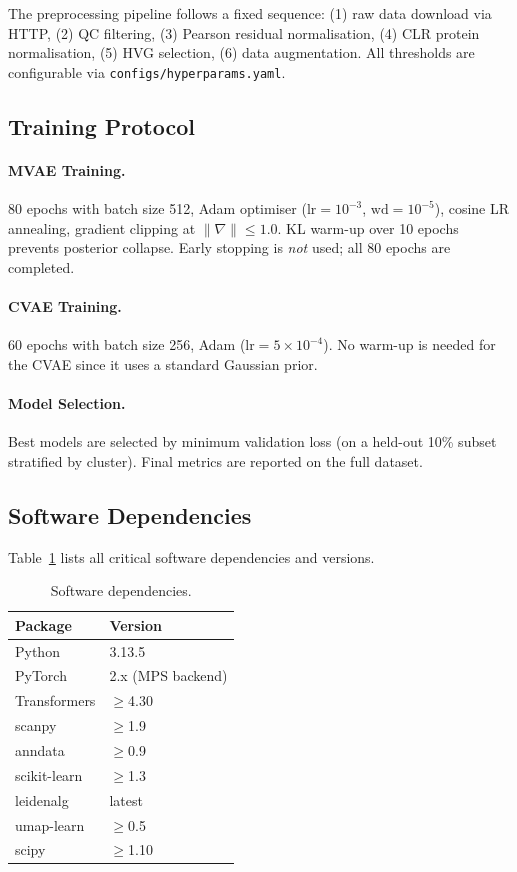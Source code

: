 \documentclass[11pt,a4paper]{article}
\begin{document}
The preprocessing pipeline follows a fixed sequence: (1) raw data download via HTTP, (2) QC filtering, (3) Pearson residual normalisation, (4) CLR protein normalisation, (5) HVG selection, (6) data augmentation.
All thresholds are configurable via \texttt{configs/hyperparams.yaml}.

\subsection{Training Protocol}

\paragraph{MVAE Training.}
80 epochs with batch size 512, Adam optimiser ($\text{lr}=10^{-3}$, $\text{wd}=10^{-5}$), cosine LR annealing, gradient clipping at $\|\nabla\| \leq 1.0$.
KL warm-up over 10 epochs prevents posterior collapse.
Early stopping is \emph{not} used; all 80 epochs are completed.

\paragraph{CVAE Training.}
60 epochs with batch size 256, Adam ($\text{lr}=5\times10^{-4}$).
No warm-up is needed for the CVAE since it uses a standard Gaussian prior.

\paragraph{Model Selection.}
Best models are selected by minimum validation loss (on a held-out 10\% subset stratified by cluster).
Final metrics are reported on the full dataset.

\subsection{Software Dependencies}

Table~\ref{tab:software} lists all critical software dependencies and versions.

\begin{table}[!ht]
\centering
\caption{Software dependencies.}
\label{tab:software}
\scriptsize
\begin{tabular}{ll}
\toprule
\textbf{Package} & \textbf{Version} \\
\midrule
Python & 3.13.5 \\
PyTorch & 2.x (MPS backend) \\
Transformers & $\geq$4.30 \\
scanpy & $\geq$1.9 \\
anndata & $\geq$0.9 \\
scikit-learn & $\geq$1.3 \\
leidenalg & latest \\
umap-learn & $\geq$0.5 \\
scipy & $\geq$1.10 \\
\bottomrule
\end{tabular}
\end{table}
\end{document}

